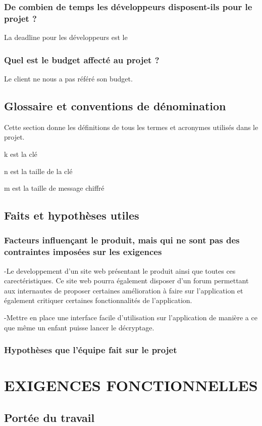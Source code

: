 \documentclass[a4]{article}
\begin{document}
			\subsubsection{ De combien de temps les développeurs disposent-ils pour le projet ?}
				La deadline pour les développeurs est le 
			\subsubsection{ Quel est le budget affecté au projet ?}
				Le client ne nous a pas référé son budget.
		\subsection{Glossaire et conventions de dénomination}
			Cette section donne les définitions de tous les termes et acronymes utilisés dans le projet.

			k est la clé

			n est la taille de la clé

			m est la taille de message chiffré
		\subsection{Faits et hypothèses utiles}	
			\subsubsection{Facteurs influençant le produit, mais qui ne sont pas des contraintes imposées sur les exigences}
				-Le developpement d'un site web présentant le produit ainsi que toutes ces carectéristiques. Ce site web pourra également 
				disposer d'un forum permettant aux internautes de proposer certaines amélioration à faire sur l'application et également 
				critiquer certaines fonctionnalités de l'application.

				-Mettre en place une interface facile d'utilisation sur l'application de manière a ce que même un enfant puisse lancer le décryptage.
			\subsubsection{Hypothèses que l’équipe fait sur le projet}
	\section{EXIGENCES FONCTIONNELLES}
		\subsection{Portée du travail}
\end{document}
